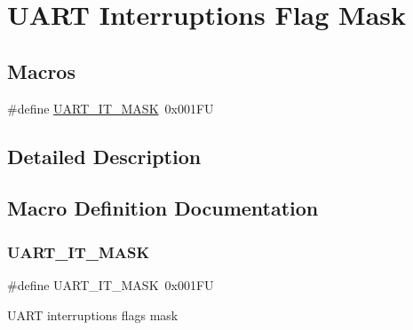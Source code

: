 \hypertarget{group___u_a_r_t___interruption___mask}{}\section{U\+A\+RT Interruptions Flag Mask}
\label{group___u_a_r_t___interruption___mask}
\subsection*{Macros}
\begin{DoxyCompactItemize}
\item 
\#define \mbox{\hyperlink{group___u_a_r_t___interruption___mask_ga869439269c26e8dee93d49b1c7e67448}{U\+A\+R\+T\+\_\+\+I\+T\+\_\+\+M\+A\+SK}}~0x001\+FU
\end{DoxyCompactItemize}


\subsection{Detailed Description}


\subsection{Macro Definition Documentation}
\mbox{\label{group___u_a_r_t___interruption___mask_ga869439269c26e8dee93d49b1c7e67448}} 
\subsubsection{\texorpdfstring{UART\_IT\_MASK}{UART\_IT\_MASK}}
{\footnotesize\ttfamily \#define U\+A\+R\+T\+\_\+\+I\+T\+\_\+\+M\+A\+SK~0x001\+FU}

U\+A\+RT interruptions flags mask 